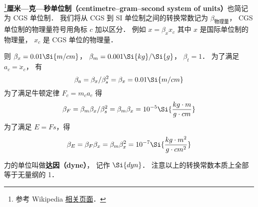 
\begin{issues}
\issueDraft
{}
\end{issues}


\footnote{参考 Wikipedia \href{https://en.wikipedia.org/wiki/Centimetre-gram-second_system_of_units}{相关页面}．}\textbf{厘米—克—秒单位制（centimetre–gram–second system of units）}也简记为 CGS 单位制． 我们将从 CGS 到 SI 单位制之间的转换常数记为 $\beta_\text{物理量}$， CGS 单位制的物理量符号用角标 $c$ 加以区分． 例如 $x = \beta_x x_c$ 其中 $x$ 是国际单位制的物理量， $x_c$ 是 CGS 单位的物理量．

则 $\beta_x = 0.01\Si{m/cm}$， $\beta_m = 0.001\Si{kg}/\Si{g}$， $\beta_t = 1$． 为了满足 $a_c = \ddot x_c$， 有
\begin{equation}
\beta_a = \beta_x/\beta_s^2 = \beta_x = 0.01 \Si{m/cm}
\end{equation}
为了满足牛顿定律 $F_c = m_ca_c$ 得
\begin{equation}
\beta_F = \beta_m \beta_x/\beta_s^2 = \beta_m\beta_x = 10^{-5} \Si{\frac{kg\cdot m}{g\cdot cm}}
\end{equation}
为了满足 $E = Fs$，得
\begin{equation}
\beta_E = \beta_F \beta_x = \beta_m\beta_x^2 =  10^{-7} \Si{\frac{kg \cdot m^2}{g\cdot cm^2}}
\end{equation}

力的单位叫做\textbf{达因（dyne）}， 记作 $\Si{dyn}$． 注意以上的转换常数本质上全部等于无量纲的 1．
